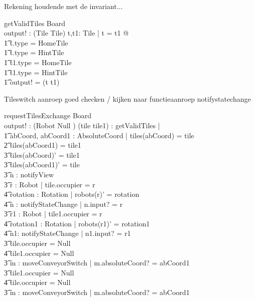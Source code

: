 \documentclass[a4paper,11pt]{article}
\begin{document}
Rekening houdende met de invariant...
\begin{schema}{getValidTiles}
\Xi Board \\
output! : (Tile \cross Tile)
\where
\exists t,t1: Tile | t \not = t1  @ \\ \t1
t.type \not = HomeTile \\ \t1
t.type \not = HintTile \\ \t1
t1.type \not = HomeTile \\ \t1
t1.type \not = HintTile \implies \\ \t1
output! = (t \cross t1)
\end{schema}

Tileswitch aanroep goed checken / kijken naar functieaanroep notifystatechange
\begin{schema}{requestTilesExchange}
\Delta Board \\
output! : ({Robot \union Null} )
\where
\exists (tile \cross tile1) : getValidTiles | \\ \t1
\exists abCoord, abCoord1 : AbsoluteCoord | tiles(abCoord) = tile \\ \t2
tiles(abCoord1) = tile1 \implies \\ \t3
tiles(abCoord)' = tile1 \\ \t3
tiles(abCoord1)' = tile \\ \t3
\exists n : notifyView \\ \t3
\exists r : Robot | tile.occupier = r \implies \\ \t4
\exists rotation : Rotation | robots(r)' = rotation \\ \t4
\exists n : notifyStateChange | n.input? = r \\ \t3
\exists r1 : Robot | tile1.occupier = r \implies \\ \t4
\exists rotation1 : Rotation | robots(r1)' = rotation1 \\ \t4
\exists n1: notifyStateChange | n1.input? = r1 \\ \t3
\IF tile.occupier = Null \\ \t4
tile1.occupier \not = Null\\ \t3
\THEN \exists m : moveConveyorSwitch | m.absoluteCoord? = abCoord1 \\ \t3
\IF tile1.occupier = Null \\ \t4
tile.occupier \not = Null \\ \t3
\THEN \exists m : moveConveyorSwitch | m.absoluteCoord? = abCoord1
\end{schema}
\end{document}
